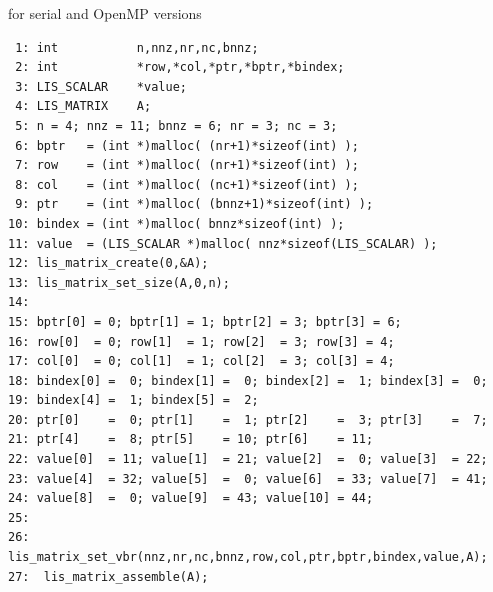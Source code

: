 \documentclass[a4paper]{article}
\begin{document}
\begin{itembox}[l]{for serial and OpenMP versions}
\small
\begin{verbatim}
 1: int           n,nnz,nr,nc,bnnz;
 2: int           *row,*col,*ptr,*bptr,*bindex;
 3: LIS_SCALAR    *value;
 4: LIS_MATRIX    A;
 5: n = 4; nnz = 11; bnnz = 6; nr = 3; nc = 3;
 6: bptr   = (int *)malloc( (nr+1)*sizeof(int) );
 7: row    = (int *)malloc( (nr+1)*sizeof(int) );
 8: col    = (int *)malloc( (nc+1)*sizeof(int) );
 9: ptr    = (int *)malloc( (bnnz+1)*sizeof(int) );
10: bindex = (int *)malloc( bnnz*sizeof(int) );
11: value  = (LIS_SCALAR *)malloc( nnz*sizeof(LIS_SCALAR) );
12: lis_matrix_create(0,&A);
13: lis_matrix_set_size(A,0,n);
14:
15: bptr[0] = 0; bptr[1] = 1; bptr[2] = 3; bptr[3] = 6;
16: row[0]  = 0; row[1]  = 1; row[2]  = 3; row[3] = 4;
17: col[0]  = 0; col[1]  = 1; col[2]  = 3; col[3] = 4;
18: bindex[0] =  0; bindex[1] =  0; bindex[2] =  1; bindex[3] =  0;
19: bindex[4] =  1; bindex[5] =  2;
20: ptr[0]    =  0; ptr[1]    =  1; ptr[2]    =  3; ptr[3]    =  7;
21: ptr[4]    =  8; ptr[5]    = 10; ptr[6]    = 11;
22: value[0]  = 11; value[1]  = 21; value[2]  =  0; value[3]  = 22;
23: value[4]  = 32; value[5]  =  0; value[6]  = 33; value[7]  = 41;
24: value[8]  =  0; value[9]  = 43; value[10] = 44;
25:
26:  lis_matrix_set_vbr(nnz,nr,nc,bnnz,row,col,ptr,bptr,bindex,value,A);
27:  lis_matrix_assemble(A);
\end{verbatim}
\end{itembox}
\end{document}
